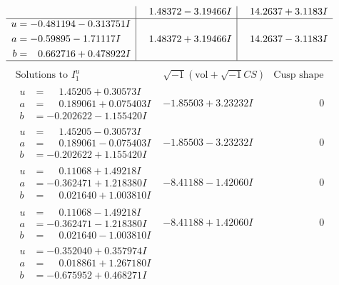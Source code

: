 \documentclass[1p]{elsarticle_modified}
\theoremstyle{definition}
\newcommand{\I}{\sqrt{-1}}
\begin{document}
$$\begin{array}{c|c|c}
 & \phantom{-}1.48372 - 3.19466 I & \phantom{-}14.2637 + 3.1183 I \\ \hline\begin{aligned}
u &= -0.481194 - 0.313751 I \\
a &= -0.59895 - 1.71117 I \\
b &= \phantom{-}0.662716 + 0.478922 I\end{aligned}
 & \phantom{-}1.48372 + 3.19466 I & \phantom{-}14.2637 - 3.1183 I\\
 \hline 
 \end{array}$$\newpage$$\begin{array}{c|c|c}  
\text{Solutions to }I^u_{1}& \I (\text{vol} + \sqrt{-1}CS) & \text{Cusp shape}\\
 \hline 
\begin{aligned}
u &= \phantom{-}1.45205 + 0.30573 I \\
a &= \phantom{-}0.189061 + 0.075403 I \\
b &= -0.202622 - 1.155420 I\end{aligned}
 & -1.85503 + 3.23232 I & \phantom{-0.000000 } 0 \\ \hline\begin{aligned}
u &= \phantom{-}1.45205 - 0.30573 I \\
a &= \phantom{-}0.189061 - 0.075403 I \\
b &= -0.202622 + 1.155420 I\end{aligned}
 & -1.85503 - 3.23232 I & \phantom{-0.000000 } 0 \\ \hline\begin{aligned}
u &= \phantom{-}0.11068 + 1.49218 I \\
a &= -0.362471 + 1.218380 I \\
b &= \phantom{-}0.021640 + 1.003810 I\end{aligned}
 & -8.41188 - 1.42060 I & \phantom{-0.000000 } 0 \\ \hline\begin{aligned}
u &= \phantom{-}0.11068 - 1.49218 I \\
a &= -0.362471 - 1.218380 I \\
b &= \phantom{-}0.021640 - 1.003810 I\end{aligned}
 & -8.41188 + 1.42060 I & \phantom{-0.000000 } 0 \\ \hline\begin{aligned}
u &= -0.352040 + 0.357974 I \\
a &= \phantom{-}0.018861 + 1.267180 I \\
b &= -0.675952 + 0.468271 I\end{aligned}

\end{array}$$
\end{document}
